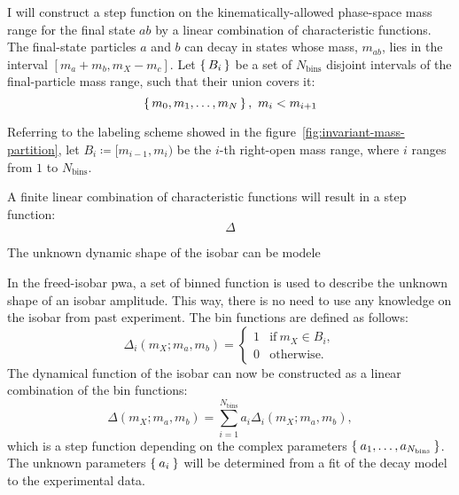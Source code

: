     {\color{red}
    I will construct a step function on the kinematically-allowed phase-space mass range for the final state $ab$ by a linear combination of characteristic functions.
    The final-state particles $a$ and $b$ can decay in states whose mass, $m_{ab}$, lies in the interval $[m_a + m_b, m_X - m_c]$.
    Let $\set{B_i}$ be a set of $N_\text{bins}$ disjoint intervals of the final-particle mass range, such that their union covers it:
    \begin{equation}
        \set{m_0,m_1,\dots,m_N},\ 
        m_i < m_{i+1}
    \end{equation}

    Referring to the labeling scheme showed in the figure~\ref{fig:invariant-mass-partition}, let $B_i \coloneqq [m_{i-1}, m_i)$ be the $i$-th right-open mass range, where $i$ ranges from $1$ to $N_\text{bins}$.

    A finite linear combination of characteristic functions will result in a step function:
    \begin{equation}
        \Delta
    \end{equation}

    The unknown dynamic shape of the isobar can be modele

    In the freed-isobar \ac{pwa}, a set of binned function is used to describe the unknown shape of an isobar amplitude.
    This way, there is no need to use any knowledge on the isobar from past experiment.
    The bin functions are defined as follows:
    \begin{equation}
        \Delta_i(m_X; m_a, m_b) =
        \begin{cases}
            1 &\text{if}\ m_X \in B_i, \\
            0 &\text{otherwise}.
        \end{cases}
    \end{equation}
    The dynamical function of the isobar can now be constructed as a linear combination of the bin functions:
    \begin{equation}
        \Delta(m_X; m_a, m_b) = \sum_{i=1}^{N_\text{bins}} a_i \Delta_i(m_X;m_a, m_b),
    \end{equation}
    which is a step function depending on the complex parameters $\Set{a_1, \dots, a_{N_\text{bins}}}$.
    The unknown parameters $\Set{ a_i }$ will be determined from a fit of the decay model to the experimental data.
    }


